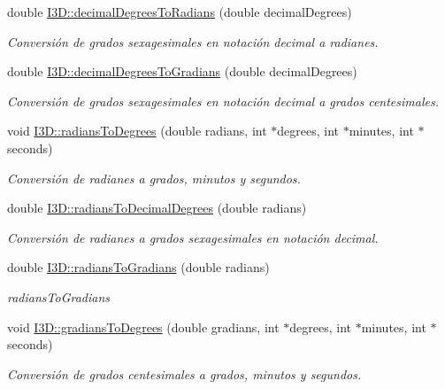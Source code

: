 \begin{DoxyCompactItemize}
double \hyperlink{group__format_conversion_gac80712e13661211ce5325142d963bdfe}{I3\+D\+::decimal\+Degrees\+To\+Radians} (double decimal\+Degrees)
\begin{DoxyCompactList}\small\item\em Conversión de grados sexagesimales en notación decimal a radianes. \end{DoxyCompactList}\item 
double \hyperlink{group__format_conversion_gabf6a21b89de5fd742a94f98732b825f2}{I3\+D\+::decimal\+Degrees\+To\+Gradians} (double decimal\+Degrees)
\begin{DoxyCompactList}\small\item\em Conversión de grados sexagesimales en notación decimal a grados centesimales. \end{DoxyCompactList}\item 
void \hyperlink{group__format_conversion_ga3f1cbd404b98911d6a7092b9063543b3}{I3\+D\+::radians\+To\+Degrees} (double radians, int $\ast$degrees, int $\ast$minutes, int $\ast$seconds)
\begin{DoxyCompactList}\small\item\em Conversión de radianes a grados, minutos y segundos. \end{DoxyCompactList}\item 
double \hyperlink{group__format_conversion_ga07a4491a18ef984ab74ddd5df5209556}{I3\+D\+::radians\+To\+Decimal\+Degrees} (double radians)
\begin{DoxyCompactList}\small\item\em Conversión de radianes a grados sexagesimales en notación decimal. \end{DoxyCompactList}\item 
double \hyperlink{group__format_conversion_ga0779b094fa341344b67294926c0c7ef0}{I3\+D\+::radians\+To\+Gradians} (double radians)
\begin{DoxyCompactList}\small\item\em radians\+To\+Gradians \end{DoxyCompactList}\item 
void \hyperlink{group__format_conversion_ga381983c467f07e74896f19393c6d900a}{I3\+D\+::gradians\+To\+Degrees} (double gradians, int $\ast$degrees, int $\ast$minutes, int $\ast$seconds)
\begin{DoxyCompactList}\small\item\em Conversión de grados centesimales a grados, minutos y segundos. \end{DoxyCompactList}\item 

\end{DoxyCompactItemize}
